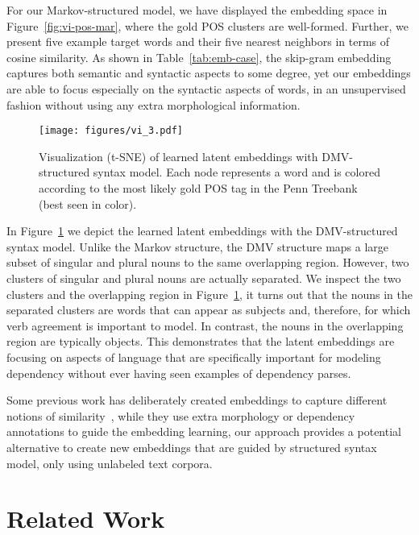 \documentclass[11pt,a4paper]{article}
\begin{document}
For our Markov-structured model, we have displayed the embedding space in Figure~\ref{fig:vi-pos-mar}, where the gold POS clusters are well-formed. Further, we present five example target words and their five nearest neighbors in terms of cosine similarity. As shown in  Table~\ref{tab:emb-case}, the skip-gram embedding captures both semantic and syntactic aspects to some degree, yet our embeddings are able to focus especially on the syntactic aspects of words, in an unsupervised fashion without using any extra morphological information. 

\begin{figure}[t]
  \centering
   \texttt{[image: figures/vi\_3.pdf]}
   \vspace{-2mm}
   \caption{Visualization (t-SNE) of learned latent embeddings with DMV-structured syntax model. Each node represents a word and is colored according to the most likely gold POS tag in the Penn Treebank (best seen in color).}
   \label{fig:vi-dmv}
   \vspace{-5mm}
\end{figure}

In Figure~\ref{fig:vi-dmv} we depict the learned latent embeddings with the DMV-structured syntax model. Unlike the Markov structure, the DMV structure maps a large subset of singular and plural nouns to the same overlapping region. However, two clusters of singular and plural nouns are actually separated. We inspect the two clusters and the overlapping region in Figure~\ref{fig:vi-dmv}, it turns out that the nouns in the separated clusters are words that can appear as subjects and, therefore, for which verb agreement is important to model. In contrast, the nouns in the overlapping region are typically objects. This demonstrates that the latent embeddings are focusing on aspects of language that are specifically important for modeling dependency without ever having seen examples of dependency parses. 

Some previous work has deliberately created embeddings to capture different notions of similarity~\citep{levy2014dependency, cotterell2015morphological}, while they use extra morphology or dependency annotations to guide the embedding learning, our approach provides a potential alternative to create new embeddings that are guided by structured syntax model, only using unlabeled text corpora.
\section{Related Work}
\end{document}
